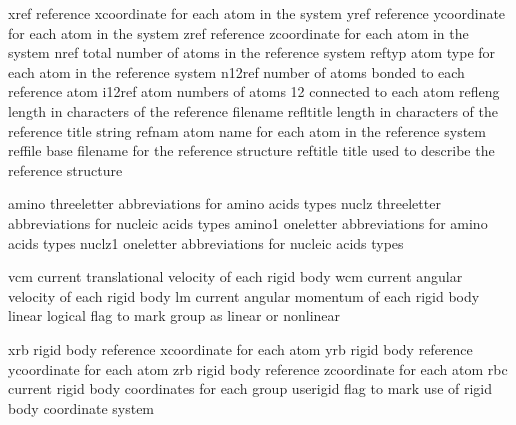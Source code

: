 \documentclass[letterpaper,11pt,english]{sphinxmanual}
\begin{document}

\begin{sphinxVerbatim}[commandchars=\\\{\}]
xref            reference x\PYGZhy{}coordinate for each atom in the system
yref            reference y\PYGZhy{}coordinate for each atom in the system
zref            reference z\PYGZhy{}coordinate for each atom in the system
nref            total number of atoms in the reference system
reftyp          atom type for each atom in the reference system
n12ref          number of atoms bonded to each reference atom
i12ref          atom numbers of atoms 1\PYGZhy{}2 connected to each atom
refleng         length in characters of the reference filename
refltitle       length in characters of the reference title string
refnam          atom name for each atom in the reference system
reffile         base filename for the reference structure
reftitle        title used to describe the reference structure
\end{sphinxVerbatim}


\begin{sphinxVerbatim}[commandchars=\\\{\}]
amino           three\PYGZhy{}letter abbreviations for amino acids types
nuclz           three\PYGZhy{}letter abbreviations for nucleic acids types
amino1          one\PYGZhy{}letter abbreviations for amino acids types
nuclz1          one\PYGZhy{}letter abbreviations for nucleic acids types
\end{sphinxVerbatim}


\begin{sphinxVerbatim}[commandchars=\\\{\}]
vcm             current translational velocity of each rigid body
wcm             current angular velocity of each rigid body
lm              current angular momentum of each rigid body
linear          logical flag to mark group as linear or nonlinear
\end{sphinxVerbatim}


\begin{sphinxVerbatim}[commandchars=\\\{\}]
xrb             rigid body reference x\PYGZhy{}coordinate for each atom
yrb             rigid body reference y\PYGZhy{}coordinate for each atom
zrb             rigid body reference z\PYGZhy{}coordinate for each atom
rbc             current rigid body coordinates for each group
use\PYGZus{}rigid       flag to mark use of rigid body coordinate system
\end{sphinxVerbatim}
\end{document}
